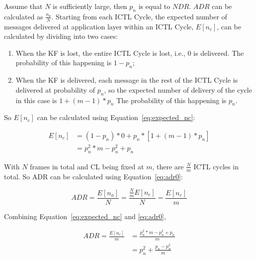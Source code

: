 \documentclass[12pt]{report}
\begin{document}
Assume that $N$ is sufficiently large, then $p_n$ is equal to $NDR$. $ADR$ can be calculated as $\frac{n_a}{N}$. Starting from each ICTL Cycle, the expected number of messages delivered at application layer within an ICTL Cycle, $E[n_c]$, can be calculated by dividing into two cases:
\begin{enumerate}
  \item When the KF is lost, the entire ICTL Cycle is lost, i.e., 0 is delivered. The probability of this happening is $1-p_n$;
  \item When the KF is delivered, each message in the rest of the ICTL Cycle is delivered at probability of $p_n$, so the expected number of delivery of the cycle in this case is $1+(m-1)*p_n$ The probability of this happening is $p_n$.
\end{enumerate}

So $E[n_c]$ can be calculated using Equation~\ref{eq:expected_nc}:

\begin{equation}
  \begin{split}
    E[n_c] & = (1-p_n) * 0 + p_n * [1 + (m - 1) * p_n] \\
           & = p_n^2 * m - p_n^2 + p_n
  \end{split}
  \label{eq:expected_nc}
\end{equation}

With $N$ frames in total and CL being fixed at $m$, there are $\frac{N}{m}$ ICTL cycles in total. So ADR can be calculated using Equation~\ref{eq:adr0}:

\begin{equation}
  ADR = \frac{E[n_a]}{N} = \frac{\frac{N}{m}E[n_c]}{N} = \frac{E[n_c]}{m}
  \label{eq:adr0}
\end{equation}

Combining Equation~\ref{eq:expected_nc} and \ref{eq:adr0},

\begin{equation}
  \begin{split}
    ADR = \frac{E[n_c]}{m} & = \frac{p_n^2*m-p_n^2+p_n}{m} \\
                           & = p_n^2 + \frac{p_n-p_n^2}{m}
  \end{split}
  \label{eq:adr}
\end{equation}
\end{document}
